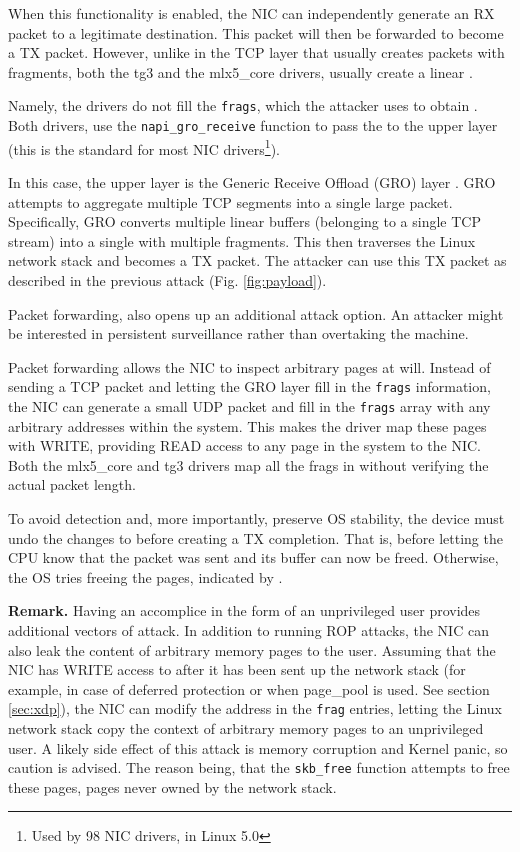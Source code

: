 When this functionality is enabled, the NIC can independently generate an RX packet to a legitimate destination. This packet will then be forwarded to become a TX packet. However, unlike in the TCP layer that usually creates \skb{} packets with fragments, both the tg3 and the mlx5\_core drivers, usually create a linear \skb{}.

Namely, the drivers do not fill the \texttt{frags}, which the attacker uses to obtain \means{}. Both drivers, use the \texttt{napi\_gro\_receive} function to pass the \skb{} to the upper layer (this is the standard for most NIC drivers\footnote{Used by 98 NIC drivers, in Linux 5.0}). 

In this case, the upper layer is the Generic Receive Offload (GRO) layer \cite{gro}. GRO attempts to aggregate multiple TCP segments into a single large packet. Specifically, GRO converts multiple linear \skb{} buffers (belonging to a single TCP stream) into a single \skb{} with multiple fragments. This \skb{} then traverses the Linux network stack and becomes a TX packet. The attacker can use this TX packet as described in the previous attack (Fig. \ref{fig:payload}).

Packet forwarding, also opens up an additional attack option. An attacker might be interested in persistent surveillance rather than overtaking the machine. 

Packet forwarding allows the NIC to inspect arbitrary pages at will. 
Instead of sending a TCP packet and letting the GRO layer fill in the \texttt{frags} information, the NIC can generate a small UDP packet and fill in the \texttt{frags} array with any arbitrary \page{} addresses within the system. This makes the driver map these pages with WRITE, providing READ access to any page in the system to the NIC. Both the mlx5\_core and tg3 drivers map all the frags in \shinfo{} without verifying the actual packet length.

To avoid detection and, more importantly, preserve OS stability, the device must undo the changes to \shinfo{} before creating a TX completion. That is, before letting the CPU know that the packet was sent and its buffer can now be freed. Otherwise, the OS tries freeing the pages, indicated by \shinfo.

\smallskip
\noindent\textbf{Remark.} Having an accomplice in the form of an unprivileged user provides additional vectors of attack. In addition to running ROP attacks, the NIC can also leak the content of arbitrary memory pages to the user. Assuming that the NIC has WRITE access to \shinfo{} after it has been sent up the network stack (for example, in case of deferred protection or when page\_pool is used. See section \ref{sec:xdp}), the NIC can modify the \page{} address in the \texttt{frag} entries, letting the Linux network stack copy the context of arbitrary memory pages to an unprivileged user. A likely side effect of this attack is memory corruption and Kernel panic, so caution is advised. The reason being, that the \texttt{skb\_free} function attempts to free these pages, pages never owned by the network stack.


